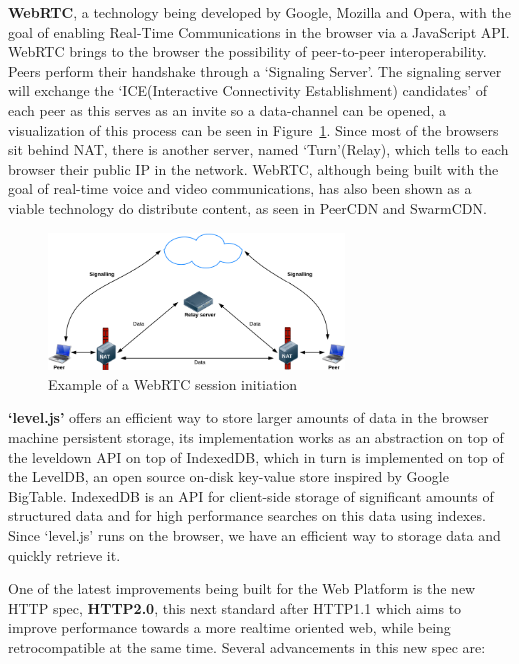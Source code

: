\textbf{WebRTC}\cite{IanHickson2013}, a technology being developed by Google, Mozilla and Opera, with the goal of enabling Real-Time Communications in the browser via a JavaScript API. WebRTC brings to the browser the possibility of peer-to-peer interoperability. Peers perform their handshake through a `Signaling Server'. The signaling server will exchange the `ICE(Interactive Connectivity Establishment) candidates' of each peer as this serves as an invite so a data-channel can be opened, a visualization of this process can be seen in Figure~\ref{fig:webrtc}. Since most of the browsers sit behind NAT, there is another server, named `Turn'(Relay), which tells to each browser their public IP in the network. WebRTC, although being built with the goal of real-time voice and video communications, has also been shown as a viable technology do distribute content, as seen in PeerCDN and SwarmCDN\cite{Vogt}.

\begin{figure}[hb]
  \centering
  \includegraphics[width=0.7\textwidth]{img/webrtc.png}
  \caption{Example of a WebRTC session initiation}
  \label{fig:webrtc}
\end{figure}

% 
% 

\textbf{`level.js'} offers an efficient way to store larger amounts of data in the browser machine persistent storage, its implementation works as an abstraction on top of the leveldown API on top of IndexedDB\cite{Recommendation2013}, which in turn is implemented on top of the LevelDB\cite{JeffreyDean;SanjayGhemawat}, an open source on-disk key-value store inspired by Google BigTable. IndexedDB is an API for client-side storage of significant amounts of structured data and for high performance searches on this data using indexes. Since `level.js' runs on the browser, we have an efficient way to storage data and quickly retrieve it.

One of the latest improvements being built for the Web Platform is the new HTTP spec, \textbf{HTTP2.0}\cite{Thomson2013}, this next standard after HTTP1.1 which aims to improve performance towards a more realtime oriented web, while being retrocompatible at the same time. Several advancements in this new spec are:

